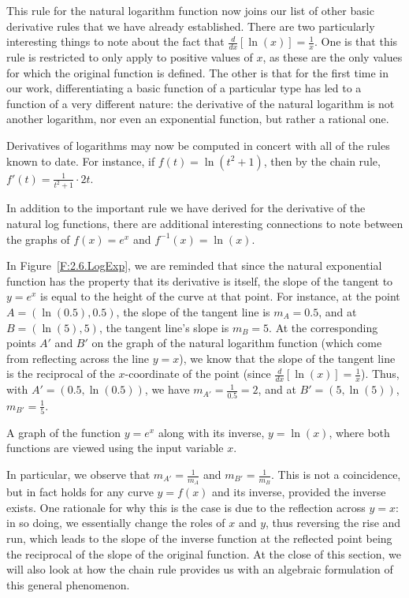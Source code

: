 This rule for the natural logarithm function now joins our list of other basic derivative rules that we have already established.  There are two particularly interesting things to note about the fact that $\frac{d}{dx}[\ln(x)] = \frac{1}{x}$. One is that this rule is restricted to only apply to positive values of $x$, as these are the only values for which the original function is defined.  The other is that for the first time in our work, differentiating a basic function of a particular type has led to a function of a very different nature:  the derivative of the natural logarithm is not another logarithm, nor even an exponential function, but rather a rational one.

Derivatives of logarithms may now be computed in concert with all of the rules known to date.  For instance, if $f(t) = \ln(t^2 + 1)$, then by the chain rule, $f'(t) = \frac{1}{t^2 + 1} \cdot 2t$.



In addition to the important rule we have derived for the derivative of the natural log functions, there are additional interesting connections to note between the graphs of $f(x) = e^x$ and $f^{-1}(x) = \ln(x)$.

In Figure~\ref{F:2.6.LogExp}, we are reminded that since the natural exponential function has the property that its derivative is itself, the slope of the tangent to $y = e^x$ is equal to the height of the curve at that point.  For instance, at the point $A = (\ln(0.5), 0.5)$, the slope of the tangent line is $m_A = 0.5$, and at $B = (\ln(5), 5)$, the tangent line's slope is $m_B = 5$.  At the corresponding points $A'$ and $B'$ on the graph of the natural logarithm function (which come from reflecting across the line $y = x$), we know that the slope of the tangent line is the reciprocal of the $x$-coordinate of the point (since $\frac{d}{dx}[\ln(x)] = \frac{1}{x}$).  Thus, with $A' = (0.5, \ln(0.5))$, we have $m_{A'} = \frac{1}{0.5} = 2$, and at $B' = (5, \ln(5))$, $m_{B'} = \frac{1}{5}$.

\begin{marginfigure}[-2cm] %
\caption{A graph of the function $y = e^x$ along with its inverse, $y = \ln(x)$, where both functions are viewed using the input variable $x$.} \label{F:2.6.LogExp}
\end{marginfigure}

In particular, we observe that $m_{A'} = \frac{1}{m_A}$ and $m_{B'} = \frac{1}{m_B}$.  This is not a coincidence, but in fact holds for any curve $y = f(x)$ and its inverse, provided the inverse exists.  One rationale for why this is the case is due to the reflection across $y = x$: in so doing, we essentially change the roles of $x$ and $y$, thus reversing the rise and run, which leads to the slope of the inverse function at the reflected point being the reciprocal of the slope of the original function.  At the close of this section, we will also look at how the chain rule provides us with an algebraic formulation of this general phenomenon.

